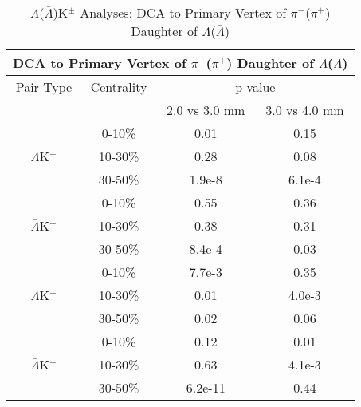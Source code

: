 \documentclass[../AnalysisNoteJBuxton.tex]{subfiles}
\begin{document}
\begin{table}
 \centering
 \begin{tabular}{|c|c|c|c|}
 \multicolumn{4}{c}{DCA to Primary Vertex of $\pi^{-}$($\pi^{+}$) Daughter of $\Lambda$($\bar{\Lambda}$)} \\
  \hline
  Pair Type & Centrality & \multicolumn{2}{c|}{p-value} \\
  \cline{3-4}
   & & 2.0 vs 3.0 mm & 3.0 vs 4.0 mm \\
  \hline    
   & 0-10\% & 0.01 & 0.15 \\
  $\Lambda$K$^{+}$ 
   & 10-30\% & 0.28 & 0.08 \\
   & 30-50\% & 1.9e-8 & 6.1e-4 \\
  \hline
   & 0-10\% & 0.55 & 0.36 \\
  $\bar{\Lambda}$K$^{-}$ 
   & 10-30\% & 0.38 & 0.31 \\
   & 30-50\% & 8.4e-4 & 0.03 \\
  \hline \hline
   & 0-10\% & 7.7e-3 & 0.35 \\
  $\Lambda$K$^{-}$ 
   & 10-30\% & 0.01 & 4.0e-3 \\
   & 30-50\% & 0.02 & 0.06 \\
  \hline
   & 0-10\% & 0.12 & 0.01 \\
  $\bar{\Lambda}$K$^{+}$ 
   & 10-30\% & 0.63 & 4.1e-3 \\
   & 30-50\% & 6.2e-11 & 0.44 \\
  \hline
 \end{tabular}
 \caption{$\Lambda$($\bar{\Lambda}$)K$^{\pm}$ Analyses: DCA to Primary Vertex of $\pi^{-}$($\pi^{+}$) Daughter of $\Lambda$($\bar{\Lambda}$)}
 \label{tab:DcaToPrimVertexPionDaughtOfLamLamKch}
\end{table}
\end{document}
